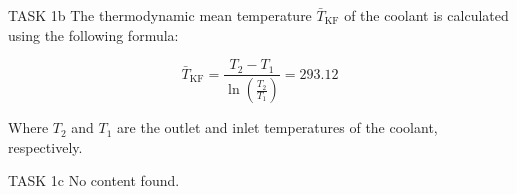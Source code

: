 TASK 1b  
The thermodynamic mean temperature \( \bar{T}_{\text{KF}} \) of the coolant is calculated using the following formula:  

\[
\bar{T}_{\text{KF}} = \frac{T_2 - T_1}{\ln\left(\frac{T_2}{T_1}\right)} = 293.12
\]

Where \( T_2 \) and \( T_1 \) are the outlet and inlet temperatures of the coolant, respectively.  

TASK 1c  
No content found.  